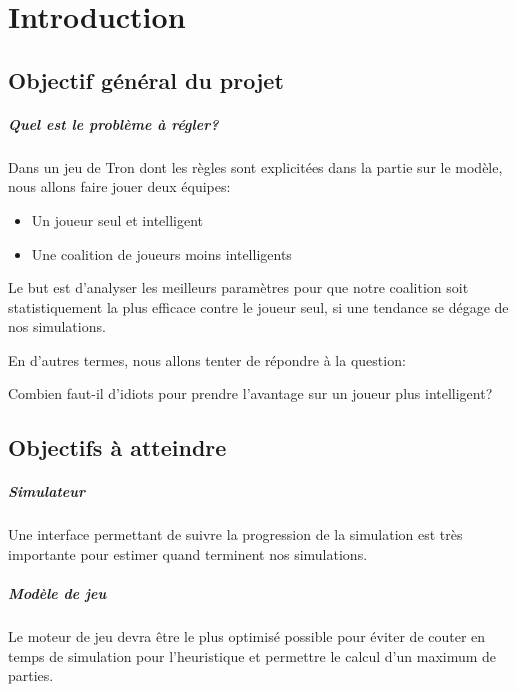 \chapter{Introduction}
		\section{Objectif général du projet}
		\paragraph{Quel est le problème à régler?}
		Dans un jeu de Tron dont les règles sont explicitées dans la partie sur le modèle, nous allons faire jouer deux équipes:
		
		\begin{itemize}
			\item Un joueur seul et intelligent
			\item Une coalition de joueurs moins intelligents
		\end{itemize}
		
		Le but est d'analyser les meilleurs paramètres pour que notre coalition soit statistiquement la plus efficace contre le joueur seul, si une tendance se dégage de nos simulations.
		
		En d'autres termes, nous allons tenter de répondre à la question:
		
		
		\begin{problem}
			\sffamily
			Combien faut-il d'idiots pour prendre l'avantage sur un joueur plus intelligent?
		\end{problem}
	
		\section{Objectifs à atteindre}
		\paragraph{Simulateur} 
		Une interface permettant de suivre la progression de la simulation est très importante pour estimer quand terminent nos simulations.
		
		\paragraph{Modèle de jeu}
		Le moteur de jeu devra être le plus optimisé possible pour éviter de couter en temps de simulation pour l'heuristique et permettre le calcul d'un maximum de parties.
		
